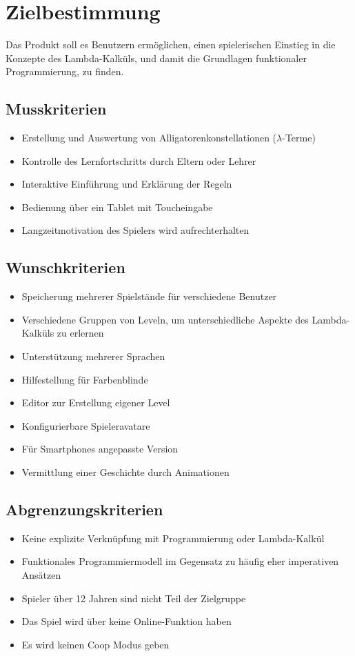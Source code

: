 \section{Zielbestimmung}
Das Produkt soll es Benutzern ermöglichen, einen spielerischen Einstieg in die Konzepte des Lambda-Kalküls, und damit die Grundlagen funktionaler Programmierung, zu finden.

\subsection{Musskriterien}

\begin{itemize}
	\item Erstellung und Auswertung von Alligatorenkonstellationen (\(\lambda\)-Terme)
	\item Kontrolle des Lernfortschritts durch Eltern oder Lehrer
	\item Interaktive Einführung und Erklärung der Regeln
	\item Bedienung über ein Tablet mit Toucheingabe
	\item Langzeitmotivation des Spielers wird aufrechterhalten
\end{itemize}


\subsection{Wunschkriterien}

\begin{itemize}
	\item Speicherung mehrerer Spielstände für verschiedene Benutzer
	\item Verschiedene Gruppen von Leveln, um unterschiedliche Aspekte des Lambda-Kalküls zu erlernen
	\item Unterstützung mehrerer Sprachen
	\item Hilfestellung für Farbenblinde
	\item Editor zur Erstellung eigener Level
	\item Konfigurierbare Spieleravatare
	\item Für Smartphones angepasste Version
	\item Vermittlung einer Geschichte durch Animationen
\end{itemize}


\subsection{Abgrenzungskriterien}

\begin{itemize}
	\item Keine explizite Verknüpfung mit Programmierung oder Lambda-Kalkül
	\item Funktionales Programmiermodell im Gegensatz zu häufig eher imperativen Ansätzen
	\item Spieler über 12 Jahren sind nicht Teil der Zielgruppe
	\item Das Spiel wird über keine Online-Funktion haben
	\item Es wird keinen Coop Modus geben
\end{itemize}
